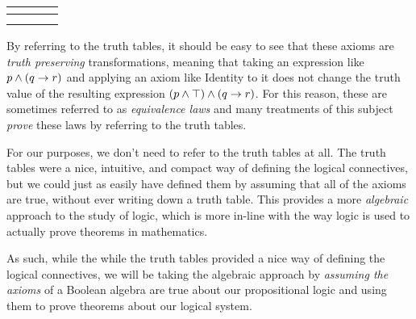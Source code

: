 \begin{definition}
    \begin{table}[H]
        \centering
        \label{tab:heyting}
        \begin{tabular}{|Cc|Cc|}
            \hline
             \\\hline
               &  \\ \hline
             &  \\ \hline
        \end{tabular}
    \end{table}

    By referring to the truth tables,
    it should be easy to see that these axioms are \emph{truth preserving} transformations,
    meaning that taking an expression like \(p \wedge (q \rightarrow r)\)
    and applying an axiom like Identity to it
    does not change the truth value of the resulting expression \((p \wedge \top) \wedge (q \rightarrow r)\).
    For this reason, these are sometimes referred to as \emph{equivalence laws} and many treatments of this subject
    \emph{prove} these laws by referring to the truth tables.

    For our purposes, we don't need to refer to the truth tables at all.
    The truth tables were a nice, intuitive, and compact way of defining the logical connectives,
    but we could just as easily have defined them by assuming that all of the axioms are true,
    without ever writing down a truth table.
    This provides a more \emph{algebraic} approach to the study of logic,
    which is more in-line with the way logic is used to actually prove theorems in mathematics.

    As such, while the while the truth tables provided a nice way of defining the logical connectives,
    we will be taking the algebraic approach by \emph{assuming the axioms} of a Boolean algebra
    are true about our propositional logic
    and using them to prove theorems about our logical system.
\end{definition}


